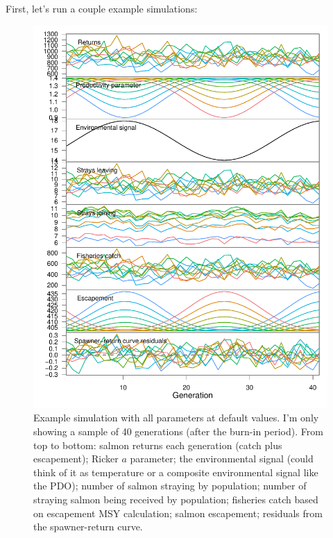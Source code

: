 \documentclass[12pt]{article}
\begin{document}
First, let's run a couple example simulations:

\begin{figure}[htbp]
\centering
\includegraphics{figure/run-base-example1.pdf}
\caption{Example simulation with all parameters at default values. I'm
only showing a sample of 40 generations (after the burn-in period). From
top to bottom: salmon returns each generation (catch plus escapement);
Ricker $a$ parameter; the environmental signal (could think of it as
temperature or a composite environmental signal like the PDO); number of
salmon straying by population; number of straying salmon being received
by population; fisheries catch based on escapement MSY calculation;
salmon escapement; residuals from the spawner-return curve.}
\end{figure}
\end{document}
